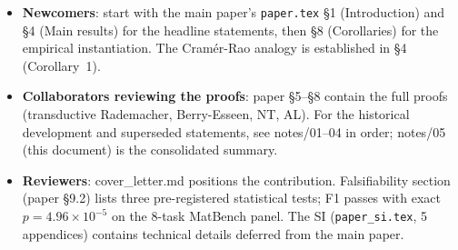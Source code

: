 \documentclass[10pt,a4paper]{article}
\begin{document}
\begin{itemize}
\item \textbf{Newcomers}: start with the main paper's
    \texttt{paper.tex} §1 (Introduction) and §4 (Main results) for
    the headline statements, then §8 (Corollaries) for the empirical
    instantiation. The Cramér-Rao analogy is established in §4
    (Corollary~1).
\item \textbf{Collaborators reviewing the proofs}: paper §5--§8 contain
    the full proofs (transductive Rademacher, Berry-Esseen, NT, AL).
    For the historical development and superseded statements, see
    notes/01--04 in order; notes/05 (this document) is the consolidated
    summary.
\item \textbf{Reviewers}: cover\_letter.md positions the contribution.
    Falsifiability section (paper §9.2) lists three pre-registered
    statistical tests; F1 passes with exact $p = 4.96 \times 10^{-5}$ on
    the 8-task MatBench panel.  The SI (\texttt{paper\_si.tex}, 5
    appendices) contains technical details deferred from the main
    paper.
\end{itemize}



\end{document}

